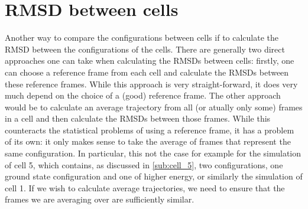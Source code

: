 
\section{RMSD between cells} %
\label{sec:rmsd_between_cells}

Another way to compare the configurations between cells if to calculate the RMSD between the configurations of the cells. There are generally two direct approaches one can take when calculating the RMSDs between cells: firstly, one can choose a reference frame from each cell and calculate the RMSDs between these reference frames. While this approach is very straight-forward, it does very much depend on the choice of a (good) reference frame. The other approach would be to calculate an average trajectory from all (or atually only some) frames in a cell and then calculate the RMSDs between those frames. While this counteracts the statistical problems of using a reference frame, it has a problem of its own: it only makes sense to take the average of frames that represent the same configuration. In particular, this not the case for example for the simulation of cell 5, which contains, as discussed in \ref{sub:cell_5}, two configurations, one ground state configuration and one of higher energy, or similarly the simulation of cell 1. If we wish to calculate average trajectories, we need to ensure that the frames we are averaging over are sufficiently similar.

